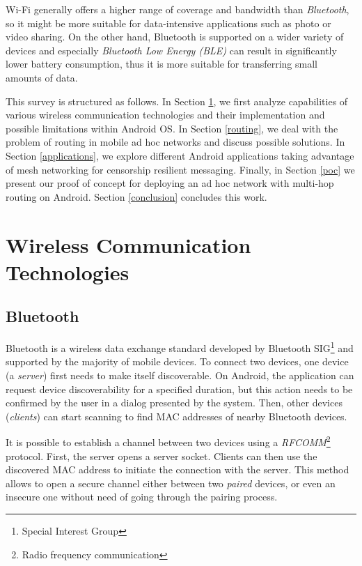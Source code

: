 \documentclass[conference,compsoc]{IEEEtran}
\begin{document}
Wi-Fi generally offers a higher range of coverage and bandwidth than \textit{Bluetooth}, so it might be more suitable for data-intensive applications such as photo or video sharing. On the other hand, Bluetooth is supported on a wider variety of devices and especially \textit{Bluetooth Low Energy (BLE)} \cite{android:ble} can result in significantly lower battery consumption, thus it is more suitable for transferring small amounts of data.

This survey is structured as follows. In Section \ref{wirelesstech}, we first analyze capabilities of various wireless communication technologies and their implementation and possible limitations within Android OS. In Section \ref{routing}, we deal with the problem of routing in mobile ad hoc networks and discuss possible solutions.
In Section \ref{applications}, we explore different Android applications taking advantage of mesh networking for censorship resilient messaging. Finally, in Section \ref{poc} we present our proof of concept for deploying an ad hoc network with multi-hop routing on Android. Section \ref{conclusion} concludes this work.

\section{Wireless Communication Technologies} \label{wirelesstech}

\subsection{Bluetooth}
Bluetooth is a wireless data exchange standard developed by Bluetooth SIG\footnote{Special Interest Group} and supported by the majority of mobile devices. To connect two devices, one device
 (a \textit{server}) first needs to make itself discoverable. On Android, the application can request device discoverability for a specified duration, but this action needs to be confirmed by the user in a dialog presented by the system. Then, other devices (\textit{clients}) can start scanning to find MAC addresses of nearby Bluetooth devices.

It is possible to establish a channel between two devices using a \textit{RFCOMM}\footnote{Radio frequency communication} protocol. First, the server opens a server socket. Clients can then use the discovered MAC address to initiate the connection with the server. This method allows to open a secure channel either between two \textit{paired} devices, or even an insecure one without need of going through the pairing process.
\end{document}
